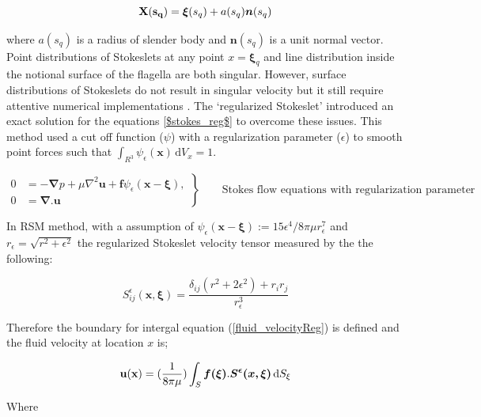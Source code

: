 \documentclass[12pt,a4paper,titlepage]{report}
\begin{document}
\begin{equation}
\bold {X(s_q)} = \bm{\xi}(s_q) + a(s_q) \bm{n}(s_q)
\label{centreline}
\end{equation}

where $a(s_q)$ is a radius of slender body and $\bm{n}(s_q)$ is a unit normal vector. Point distributions of 
Stokeslets at any point $x = \bm{\xi}_q$ and line distribution inside the notional surface
of the flagella are both singular. However, surface distributions of Stokeslets do not result in singular  velocity
 but it still require attentive numerical implementations \citep{smith2009boundary}. The \lq{regularized Stokeslet}\rq{}
 introduced an exact solution for the equations \ref{$stokes_reg$} to overcome these issues. 
This method used a cut off function ($\psi$) with a regularization parameter ($\epsilon$) to smooth point forces 
such that $\int_{R^3} \psi_{\epsilon} (\bm{x})\, \mathrm{d}V_x = 1$.



\begin{equation}
 \left.\begin{aligned}
        0 &= - \bm{\nabla} p + \mu \nabla ^ 2 \bm{u} + \bm{f} \psi_\epsilon (\bm{x} - \bm{\xi}), \\
        0 &=\bm{\nabla . u}
       \end{aligned}
 \right\}
 \qquad \text{Stokes flow equations with regularization parameter}
\label{stokes_reg}
\end{equation}

In RSM method, with a assumption of $\psi_{\epsilon}(\bm{x} - \bm{\xi}) := 15\epsilon^4 /8\pi \mu r_{\epsilon}^7$ 
and $r_{\epsilon} = \sqrt{r^2 + \epsilon ^2}$ the regularized Stokeslet velocity tensor measured by the the following:


\begin{equation}
 S _{ij}^{\epsilon} \bm{(x , \xi)} = \frac{\delta _{ij}(r^2 + 2{\epsilon}^2) + r_i r_j}{r_{\epsilon}^3}
\label{velocity-tensor}
\end{equation}

Therefore the boundary for intergal equation (\ref{fluid_velocityReg}) is defined and the fluid velocity at location $x$ is;

\begin{equation}
\bold {u(x)} =(\frac{1}{8 \pi \mu}) \int_S \mathrm \bm{f(\xi)} . \bm{S^{\epsilon}( x, \xi)}\, \mathrm{d}S_{\xi}
\label{fluid_velocityReg}
\end{equation}

Where 
\end{document}

